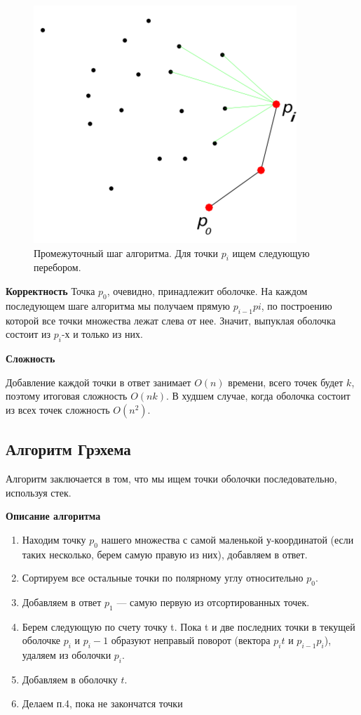 \begin{figure}[h!]
	\centering
	\includegraphics[width=0.4\linewidth]{img_easy/13_1.png}
	\captionsetup{labelformat=empty}
	\caption{Промежуточный шаг алгоритма. 
		Для точки $p_i$ ищем следующую перебором.}
\end{figure}
\textbf{Корректность}
Точка $p_0$, очевидно, принадлежит оболочке. На каждом последующем шаге алгоритма мы получаем прямую $p_{i-1}pi$, по построению которой все точки множества лежат слева от нее. 
Значит, выпуклая оболочка состоит из $p_i$-х и только из них.

\textbf{Сложность}

Добавление каждой точки в ответ занимает $O(n)$ времени, всего точек будет $k$, поэтому итоговая сложность $O(nk)$. В худшем случае, когда оболочка состоит из всех точек сложность $O(n^2)$.

\subsection{Алгоритм Грэхема}
Алгоритм заключается в том, что мы ищем точки оболочки последовательно, используя стек.

\textbf{Описание алгоритма}

\begin{enumerate}
	\item Находим точку $p_0$
	нашего множества с самой маленькой у-координатой (если таких несколько, берем самую правую из них), добавляем в ответ.
	\item Сортируем все остальные точки по полярному углу относительно $p_0$.
	\item Добавляем в ответ $p_1$ --- самую первую из отсортированных точек.
	\item Берем следующую по счету точку t.
	Пока t и две последних точки в текущей оболочке $p_i$ и $p_i-1$ образуют неправый поворот (вектора $p_it$ и $p_{i-1}p_i$), удаляем из оболочки $p_i$.
	\item Добавляем в оболочку $t$.
	\item Делаем п.4, пока не закончатся точки
\end{enumerate}

